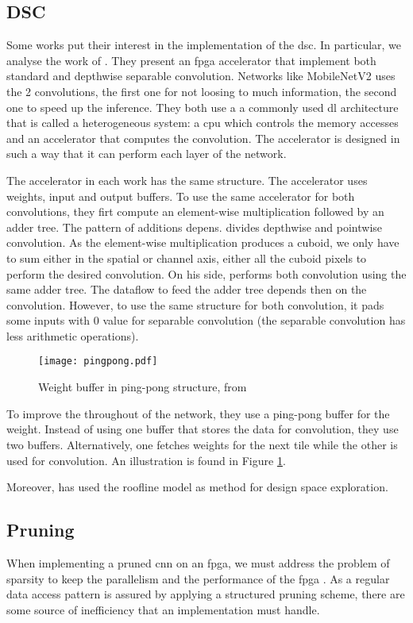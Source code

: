 \subsection{DSC}
%
%
Some works put their interest in the implementation of the \acrshort{dsc}. In particular, we analyse the work of \textcite{bai_cnn_2018, liu_fpga-based_2019}. They present an \acrshort{fpga} accelerator that implement both standard and depthwise separable convolution. Networks like MobileNetV2 uses the 2 convolutions, the first one for not loosing to much information, the second one to speed up the inference. They both use a a commonly used \acrshort{dl} architecture that is called a heterogeneous system: a \acrshort{cpu} which controls the memory accesses and an accelerator that computes the convolution. The accelerator is designed in such a way that it can perform each layer of the network.

The accelerator in each work has the same structure. The accelerator uses weights, input and output buffers. To use the same accelerator for both convolutions, they firt compute an element-wise multiplication followed by an adder tree. The pattern of additions depens. \textcite{bai_cnn_2018} divides depthwise and pointwise convolution. As the element-wise multiplication produces a cuboid, we only have to sum either in the spatial or channel axis, either all the cuboid pixels to perform the desired convolution. On his side, \textcite{liu_fpga-based_2019} performs both convolution using the same adder tree. The dataflow to feed the adder tree depends then on the convolution. However, to use the same structure for both convolution, it pads some inputs with 0 value for separable convolution (the separable convolution has less arithmetic operations).

\begin{figure}
	\centering
	\texttt{[image: pingpong.pdf]}
	\caption{Weight buffer in ping-pong structure, from \cite{bai_cnn_2018}}
	\label{fig:ping_pong_buffer}
\end{figure}
%
To improve the throughout of the network, they use a ping-pong buffer for the weight. Instead of using one buffer that stores the data for convolution, they use two buffers. Alternatively, one fetches weights for the next tile while the other is used for convolution. An illustration is found in Figure \ref{fig:ping_pong_buffer}.

Moreover, \textcite{liu_fpga-based_2019} has used the roofline model as method for design space exploration.
%
%
\subsection{Pruning} \label{subsec:impl_prun}
%
%
When implementing a pruned \acrshort{cnn} on an \acrshort{fpga}, we must address the problem of sparsity to keep the parallelism and the performance of the \acrshort{fpga} \cite{zhu_efficient_2020}. As a regular data access pattern is assured by applying a structured pruning scheme, there are some source of inefficiency that an implementation must handle.

